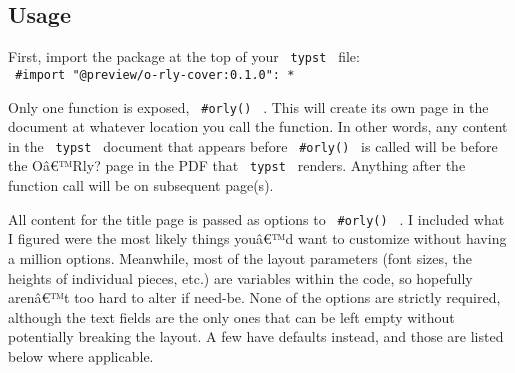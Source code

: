 \begin{Shaded}
\begin{Highlighting}[]
\OperatorTok{:} \OperatorTok{*}

\OperatorTok{:}\NormalTok{)}\OperatorTok{,}
\OperatorTok{:} \OperatorTok{,}
\OperatorTok{{-}}\OperatorTok{:} \OperatorTok{,}
\OperatorTok{:} \OperatorTok{,}
\OperatorTok{:} \OperatorTok{,}
\OperatorTok{:} 
\NormalTok{)}
\end{Highlighting}
\end{Shaded}


\subsection{Usage}\label{usage}

First, import the package at the top of your \texttt{\ typst\ } file:
\texttt{\ \#import\ "@preview/o-rly-cover:0.1.0":\ *\ }

Only one function is exposed, \texttt{\ \#orly()\ } . This will create
its own page in the document at whatever location you call the function.
In other words, any content in the \texttt{\ typst\ } document that
appears before \texttt{\ \#orly()\ } is called will be before the
Oâ€™Rly? page in the PDF that \texttt{\ typst\ } renders. Anything after
the function call will be on subsequent page(s).

All content for the title page is passed as options to
\texttt{\ \#orly()\ } . I included what I figured were the most likely
things youâ€™d want to customize without having a million options.
Meanwhile, most of the layout parameters (font sizes, the heights of
individual pieces, etc.) are variables within the code, so hopefully
arenâ€™t too hard to alter if need-be. None of the options are strictly
required, although the text fields are the only ones that can be left
empty without potentially breaking the layout. A few have defaults
instead, and those are listed below where applicable.

